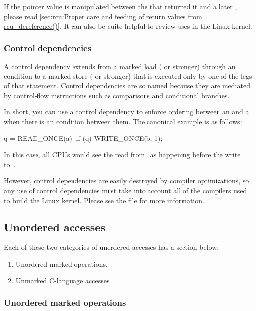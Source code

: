 If the pointer value is manipulated between the 
that returned it and a later , please read
\cref{sec:rcu:Proper care and feeding of return values from rcu_dereference()}.
It can also be quite helpful to review uses in the Linux kernel.


\subsubsection{Control dependencies}

A control dependency extends from a marked load ( or stronger)
through an  condition to a marked store ( or stronger)
that is executed only by one of the legs of that  statement.
Control dependencies are so named because they are mediated by
control-flow instructions such as comparisons and conditional branches.

In short, you can use a control dependency to enforce ordering between
an  and a  when there is an  condition
between them.
The canonical example is as follows:

\begin{VerbatimU}
	q = READ_ONCE(a);
	if (q)
		WRITE_ONCE(b, 1);
\end{VerbatimU}

In this case, all CPUs would see the read from~ as happening before
the write to~.

However, control dependencies are easily destroyed by compiler
optimizations, so any use of control dependencies must take into account
all of the compilers used to build the Linux kernel.
Please see the  file for more information.


\subsection{Unordered accesses}

Each of these two categories of unordered accesses has a section below:

\begin{enumerate}
 \item	Unordered marked operations.

 \item	Unmarked C-language accesses.
\end{enumerate}


\subsubsection{Unordered marked operations}


